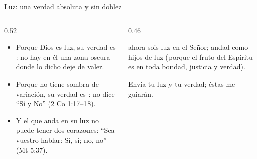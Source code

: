 \begin{frame}{Luz: una verdad absoluta y sin doblez}
\begin{columns}[t,onlytextwidth]
\begin{column}{0.52\textwidth}\small
\begin{itemize}
\item Porque Dios es luz, su verdad es : no hay en él una zona oscura donde lo dicho deje de valer.
\item Porque no tiene sombra de variación, su verdad es : no dice ``Sí y No'' (2 Co 1:17--18).
\item Y el que anda en su luz no puede tener dos corazones: ``Sea vuestro hablar: Sí, sí; no, no'' (Mt 5:37).
\end{itemize}
\end{column}
\begin{column}{0.46\textwidth}
\begin{cita}ahora sois luz en el Señor; andad como hijos de luz (porque el fruto del Espíritu es en toda bondad, justicia y verdad).\end{cita}
\begin{cita}Envía tu luz y tu verdad; éstas me guiarán.\end{cita}
\end{column}
\end{columns}\par\smallskip
{}
\end{frame}



